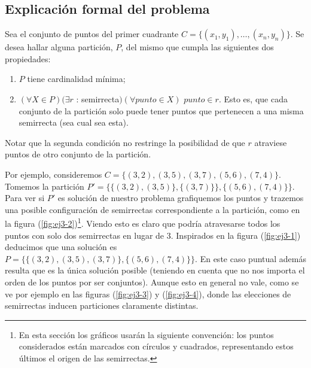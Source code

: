 \subsection{Explicación formal del problema}
\label{subsec:problema3}
Sea el conjunto de puntos del primer cuadrante $C = \{(x_1, y_1), \hdots, (x_n, y_n)\}$. Se desea hallar alguna partición, $P$, del mismo que cumpla las siguientes dos propiedades:
\begin{enumerate}
  \item $P$ tiene cardinalidad mínima;
  \item $(\forall X \in P) (\exists r$ : semirrecta$) (\forall punto \in X)$ $punto \in r$. Esto es, que cada conjunto de la partición solo puede tener puntos que pertenecen a una misma semirrecta (sea cual sea esta). 
\end{enumerate}
Notar que la segunda condición no restringe la posibilidad de que $r$ atraviese puntos de otro conjunto de la partición. 

Por ejemplo, consideremos $C=\{(3,2), (3,5), (3,7), (5,6), (7,4)\}$. Tomemos la partición $P' = \{\{(3,2), (3,5)\}, \{(3,7)\}\},\{(5,6), (7,4)\}\}$. Para ver si $P'$ es solución de nuestro problema grafiquemos los puntos y trazemos una posible configuración de semirrectas correspondiente a la partición, como en la figura (\ref{fig:ej3-2})\footnote{En esta sección los gráficos usarán la siguiente convención: los puntos considerados están marcados con círculos y cuadrados, representando estos últimos el origen de las semirrectas. }. Viendo esto es claro que podría atravesarse todos los puntos con solo dos semirrectas en lugar de 3. Inspirados en la figura (\ref{fig:ej3-1}) deducimos que una solución es $P = \{\{(3,2), (3,5), (3,7)\},\{(5,6), (7,4)\}\}$. En este caso puntual además resulta que es la única solución posible (teniendo en cuenta que no nos importa el orden de los puntos por ser conjuntos). Aunque esto en general no vale, como se ve por ejemplo en las figuras (\ref{fig:ej3-3}) y (\ref{fig:ej3-4}), donde las elecciones de semirrectas inducen particiones claramente distintas.

